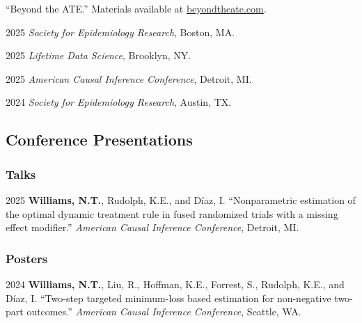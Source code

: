 \documentclass[12pt,letterpaper]{report}
\newcommand{\listitemspace}{0.15em}
\renewenvironment{itemize}
{\begin{list}{}{\setlength{\leftmargin}{0em}
            \setlength{\parskip}{0em}
            \setlength{\itemsep}{\listitemspace}
            \setlength{\parsep}{\listitemspace}}}
    {\end{list}}
\begin{document}
     \enquote{Beyond the ATE.} Materials available at \href{https://beyondtheate.com/}{beyondtheate.com}.\\
    
    \begin{itemize}
    
    \item \hspace{1em} 2025 \textit{Society for Epidemiology Research}, Boston, MA. 
    \item \hspace{1em} 2025 \textit{Lifetime Data Science}, Brooklyn, NY. 
    \item \hspace{1em} 2025 \textit{American Causal Inference Conference}, Detroit, MI. 
    \item \hspace{1em} 2024 \textit{Society for Epidemiology Research}, Austin, TX. 
    
    \end{itemize}

    \subsection*{Conference Presentations}
    
    \subsubsection{Talks}
    
    \begin{tablist}
    
    \item[2025] \tab \textbf{Williams, N.T.}, Rudolph, K.E., and Díaz, I. \enquote{Nonparametric estimation of the optimal dynamic treatment rule in fused randomized trials with a missing effect modifier.} \textit{American Causal Inference Conference}, Detroit, MI.
    
    \end{tablist}
    
    \subsubsection{Posters}

    \begin{tablist}
    
    \item[2024] \tab \textbf{Williams, N.T.}, Liu, R., Hoffman, K.E., Forrest, S., Rudolph, K.E., and Díaz, I. \enquote{Two-step targeted minimum-loss based estimation for non-negative two-part outcomes.} \textit{American Causal Inference Conference}, Seattle, WA.

    \end{tablist}
    
\end{document}

